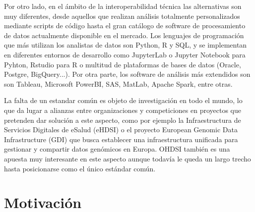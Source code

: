 Por otro lado, en el ámbito de la interoperabilidad técnica las alternativas son muy diferentes, desde aquellos que realizan análisis totalmente personalizados mediante scripts de código hasta el gran catálogo de software de procesamiento de datos actualmente disponible en el mercado. Los lenguajes de programación que más utilizan los analistas de datos son Python, R y SQL, y se implementan en diferentes entornos de desarrollo como JupyterLab o Jupyter Notebook para Pyhton, Rstudio para R o multitud de plataformas de bases de datos (Oracle, Postgre, BigQuery...). Por otra parte, los software de análisis más extendidos son son Tableau, Microsoft PowerBI, SAS, MatLab, Apache Spark, entre otras. 


La falta de un estandar común es objeto de investigación en todo el mundo, lo que da lugar a alianzas entre organizaciones y competiciones en proyectos que pretenden dar solución a este aspecto, como por ejemplo la Infraestructura de Servicios Digitales de eSalud (eHDSI) \cite{DHE2023eHDSI} %
o el proyecto European Genomic Data Infrastructure (GDI) \cite{GDI2022GDI} que busca establecer una infraestructura unificada para gestionar y compartir datos genómicos en Europa. OHDSI también es una apuesta muy interesante en este aspecto aunque todavía le queda un largo trecho hasta posicionarse como el único estándar común.



\section{Motivación} \label{sec:01Motivacion}


